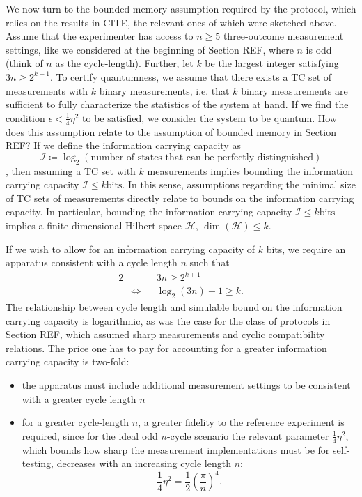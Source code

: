 We now turn to the bounded memory assumption required by the protocol, which relies on the results in CITE, the relevant ones of which were sketched above. Assume that the experimenter has access to $n\geq 5$ three-outcome measurement settings, like we considered at the beginning of Section REF, where $n$ is odd (think of $n$ as the cycle-length). Further, let $k$ be the largest integer satisfying $3n\geq 2^{k+1}$. To certify quantumness, we assume that there exists a TC set of measurements with $k$ binary measurements, i.e. that $k$ binary measurements are sufficient to fully characterize the statistics of the system at hand. If we find the condition $\epsilon<\frac{1}{4}\eta^2$ to be satisfied, we consider the system to be quantum.  How does this assumption relate to the assumption of bounded memory in Section REF? If we define the information carrying capacity as 
\begin{equation}
\mathcal{I}\coloneqq \log_2(\text{number of states that can be perfectly distinguished})
\end{equation},
then assuming a TC set with $k$ measurements implies bounding the information carrying capacity $\mathcal{I}\leq k \text{bits}$. In this sense, assumptions regarding the minimal size of TC sets of measurements directly relate to bounds on the information carrying capacity. In particular, bounding the information carrying capacity $\mathcal{I}\leq k \text{bits}$ implies a finite-dimensional Hilbert space $\mathcal{H}$, $\operatorname{dim}(\mathcal{H})\leq k$.

If we wish to allow for an information carrying capacity of $k$ bits, we require an apparatus consistent with a cycle length $n$ such that
\begin{alignat}{2}
& && 3n\geq 2^{k+1} \\
& \iff && \log_2(3n)-1\geq k.
\end{alignat}
The relationship between cycle length and simulable bound on the information carrying capacity is logarithmic, as was the case for the class of protocols in Section REF, which assumed sharp measurements and cyclic compatibility relations. The price one has to pay for accounting for a greater information carrying capacity is two-fold:
\begin{itemize}
\item the apparatus must include additional measurement settings to be consistent with a greater cycle length $n$
\item for a greater cycle-length $n$, a greater fidelity to the reference experiment is required, since for the ideal odd $n$-cycle scenario the relevant parameter $\frac{1}{4}\eta^2$, which bounds how sharp the measurement implementations must be for self-testing, decreases with an increasing cycle length $n$:
\begin{equation}
\frac{1}{4}\eta^2 = \frac{1}{2}(\frac{\pi}{n})^4.
\end{equation}
\end{itemize}

